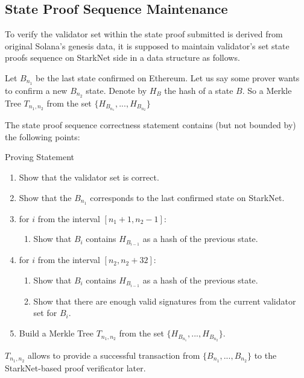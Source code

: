 \subsection{State Proof Sequence Maintenance}
\label{section:architecture:stateseq}

To verify the validator set within the state proof submitted is derived from 
original Solana's genesis data, it is supposed to maintain validator's set state
proofs sequence on StarkNet side in a data structure as follows.

Let $B_{n_1}$ be the last state confirmed on Ethereum. Let us say some prover 
wants to confirm a new $B_{n_2}$ state. Denote by $H_{B}$ the hash of a state $B$.
So a Merkle Tree $T_{n_1, n_2}$ from the set $\{H_{B_{n_1}}, ..., H_{B_{n_2}}\}$


The state proof sequence correctness statement contains (but not bounded by) the following points:
\begin{algorithm}[h!]
    \caption{Proving Statement}
    \label{circuit}
    \begin{enumerate}
        \item Show that the validator set is correct.
        \item Show that the $B_{n_1}$ corresponds to the last confirmed state on StarkNet.
        \item for $i$ from the interval $[n_1 + 1, n_2 - 1]$:
        \begin{enumerate}
            \item Show that $B_{i}$ contains $H_{B_{i - 1}}$ as a hash of the previous state.
        \end{enumerate}
        \item for $i$ from the interval $[n_2, n_2 + 32]$:
        \begin{enumerate}
            \item Show that $B_{i}$ contains $H_{B_{i - 1}}$ as a hash of the previous state.
            \item Show that there are enough valid signatures from the current validator set for $B_{i}$.
        \end{enumerate}
        \item Build a Merkle Tree $T_{n_1, n_2}$ from the set $\{H_{B_{n_1}}, ..., H_{B_{n_2}}\}$.
    \end{enumerate}
\end{algorithm}

$T_{n_1, n_2}$ allows to provide a successful transaction from $\{B_{n_1}, ..., B_{n_2}\}$ to the StarkNet-based proof verificator later.
